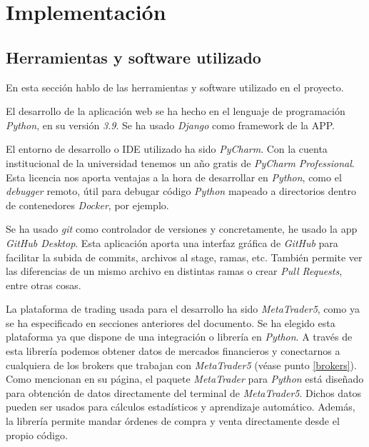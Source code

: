 
\chapter{Implementación}\label{cap:implementacion}

\section{Herramientas y software utilizado}

En esta sección hablo de las herramientas y software utilizado en el proyecto. \newline

El desarrollo de la aplicación web se ha hecho en el lenguaje de programación \textit{Python}, en su versión \textit{3.9}. Se ha usado \textit{Django} como framework de la APP. \newline

El entorno de desarrollo o IDE utilizado ha sido \textit{PyCharm}. Con la cuenta institucional de la universidad tenemos un año gratis de \textit{PyCharm} \textit{Professional}. Esta licencia nos aporta ventajas a la hora de desarrollar en \textit{Python}, como el \textit{debugger} remoto, útil para debugar código \textit{Python} mapeado a directorios dentro de contenedores \textit{Docker}, por ejemplo. \newline

Se ha usado \textit{git} como controlador de versiones y concretamente, he usado la app \textit{GitHub Desktop}. Esta aplicación aporta una interfaz gráfica de \textit{GitHub} para facilitar la subida de commits, archivos al stage, ramas, etc. También permite ver las diferencias de un mismo archivo en distintas ramas o crear \textit{Pull Requests}, entre otras cosas. \newline

La plataforma de trading usada para el desarrollo ha sido \textit{MetaTrader5}, como ya se ha especificado en secciones anteriores del documento. Se ha elegido esta plataforma ya que dispone de una integración o librería en \textit{Python}. A través de esta librería podemos obtener datos de mercados financieros y conectarnos a cualquiera de los brokers que trabajan con \textit{MetaTrader5} (véase punto \ref{brokers}). Como mencionan en su página, el paquete \textit{MetaTrader} para \textit{Python} está diseñado para obtención de datos directamente del terminal de \textit{MetaTrader5}. Dichos datos pueden ser usados para cálculos estadísticos y aprendizaje automático. Además, la librería permite mandar órdenes de compra y venta directamente desde el propio código. \newline


